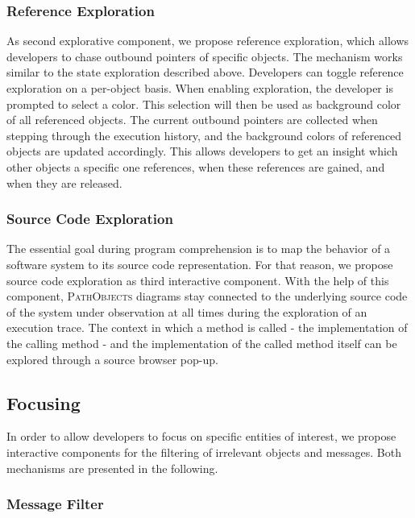 \subsubsection{Reference Exploration}
As second explorative component, we propose reference exploration, which allows developers to chase outbound pointers of specific objects.
The mechanism works similar to the state exploration described above.
Developers can toggle reference exploration on a per-object basis.
When enabling exploration, the developer is prompted to select a color.
This selection will then be used as background color of all referenced objects.
The current outbound pointers are collected when stepping through the execution history, and the background colors of referenced objects are updated accordingly.
This allows developers to get an insight which other objects a specific one references, when these references are gained, and when they are released.

\subsubsection{Source Code Exploration}
The essential goal during program comprehension is to map the behavior of a software system to its source code representation.
For that reason, we propose source code exploration as third interactive component.
With the help of this component, \textsc{PathObjects} diagrams stay connected to the underlying source code of the system under observation at all times during the exploration of an execution trace.
The context in which a method is called - the implementation of the calling method - and the implementation of the called method itself can be explored through a source browser pop-up.

\subsection{Focusing}
\label{ss:ApproachInteractiveFocusing}
In order to allow developers to focus on specific entities of interest, we propose interactive components for the filtering of irrelevant objects and messages.
Both mechanisms are presented in the following.

\subsubsection{Message Filter}

